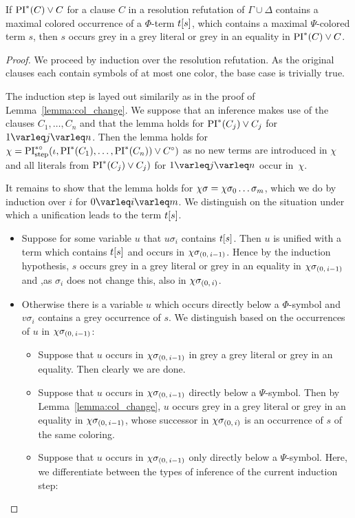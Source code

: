 \documentclass[,%
	draft=false,%
	numbers=noendperiod
	12pt,
	a4paper,
	oneside,%
	openany,
]{memoir}
\newcommand{\inv}{\ensuremath{\chi}}
\begin{document}
\begin{clemma}
	If $\operatorname{PI}^*(C) \lor C$ for a clause $C$ in a resolution refutation of $\Gamma \cup \Delta$ contains a maximal colored occurrence of a $\Phi$-term $t[s]$, which contains a maximal $\Psi$-colored term $s$, then $s$ occurs grey in a grey literal or grey in an equality in $\operatorname{PI}^*(C) \lor C$.
\end{clemma}
\begin{proof}
	We proceed by induction over the resolution refutation.
	As the original clauses each contain symbols of at most one color, the base case is trivially true.

	The induction step is layed out similarily as in the proof of Lemma~\ref{lemma:col_change}. 
	We suppose that an inference makes use of the clauses $C_1, \dots, C_n$ and that the lemma holds for $\operatorname{PI}^*(C_j) \lor C_j$ for $1\varleq j \varleq n$. 
	Then the lemma holds for $\inv = \PIstepstarnosigma(\inference, \PI^*(C_1), \dots, \PI^*(C_n)) \lor C\nosigma)$ as no new terms are introduced in $\inv$ and all literals from $\operatorname{PI}^*(C_j) \lor C_j)$ for $1\varleq j \varleq n$ occur in~$\inv$.

	It remains to show that the lemma holds for $\inv\sigma = \inv \sigma_0 \quantifierdots \sigma_m$, which we do by induction over $i$ for $0 \varleq i \varleq m$.
	We distinguish on the situation under which a unification leads to the term $t[s]$.

	\begin{itemize}
		\item 
			Suppose for some variable $u$ that $u\sigma_i$ contains $t[s]$. 
			Then $u$ is unified with a term which contains $t[s]$ and occurs in $\inv\sigmazmi$.
			Hence by the induction hypothesis, $s$ occurs grey in a grey literal or grey in an equality in $\inv\sigmazmi$ and ,as $\sigma_i$ does not change this, also in $\inv\sigmazi$.

		\item 
			Otherwise there is a variable $u$ which occurs directly below a $\Phi$-symbol and $v\sigma_i$ contains a grey occurrence of $s$.
			We distinguish based on the occurrences of $u$ in $\inv\sigmazmi$:

			\begin{itemize}
				\item Suppose that $u$ occurs in $\inv\sigmazmi$ in grey a grey literal or grey in an equality. Then clearly we are done.
				\item Suppose that $u$ occurs in $\inv\sigmazmi$ directly below a $\Psi$-symbol.
					Then by Lemma~\ref{lemma:col_change}, $u$ occurs grey in a grey literal or grey in an equality in $\inv\sigmazmi$, whose successor in $\inv\sigmazi$ is an occurrence of $s$ of the same coloring.
				\item Suppose that $u$ occurs in $\inv\sigmazmi$ only directly below a $\Psi$-symbol.
					Here, we differentiate between the types of inference of the current induction step:


\end{itemize}
\end{itemize}
\end{proof}
\end{document}
